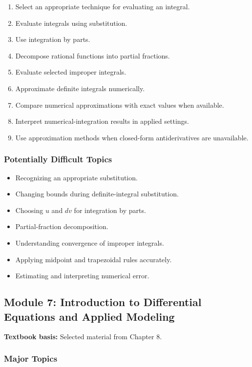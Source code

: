\documentclass[11pt]{article}
\begin{document}
\begin{enumerate}[label=\arabic*.]
    \item Select an appropriate technique for evaluating an integral.
    \item Evaluate integrals using substitution.
    \item Use integration by parts.
    \item Decompose rational functions into partial fractions.
    \item Evaluate selected improper integrals.
    \item Approximate definite integrals numerically.
    \item Compare numerical approximations with exact values when available.
    \item Interpret numerical-integration results in applied settings.
    \item Use approximation methods when closed-form antiderivatives are unavailable.
\end{enumerate}

\subsubsection*{Potentially Difficult Topics}

\begin{itemize}
    \item Recognizing an appropriate substitution.
    \item Changing bounds during definite-integral substitution.
    \item Choosing \(u\) and \(dv\) for integration by parts.
    \item Partial-fraction decomposition.
    \item Understanding convergence of improper integrals.
    \item Applying midpoint and trapezoidal rules accurately.
    \item Estimating and interpreting numerical error.
\end{itemize}

\subsection{Module 7: Introduction to Differential Equations and Applied Modeling}

\textbf{Textbook basis:} Selected material from Chapter 8.

\subsubsection*{Major Topics}
\end{document}
